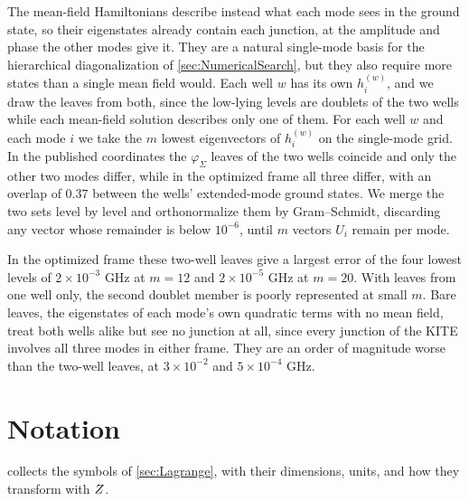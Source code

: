 The mean-field Hamiltonians describe instead what each mode sees in the ground state, so their eigenstates already contain each junction, at the amplitude and phase the other modes give it.
They are a natural single-mode basis for the hierarchical diagonalization of \cref{sec:NumericalSearch}, but they also require more states than a single mean field would.
Each well $w$ has its own $h_i^{(w)}$, and we draw the leaves from both, since the low-lying levels are doublets of the two wells while each mean-field solution describes only one of them.
For each well $w$ and each mode $i$ we take the $m$ lowest eigenvectors of $h_i^{(w)}$ on the single-mode grid.
In the published coordinates the $\varphi_\Sigma$ leaves of the two wells coincide and only the other two modes differ, while in the optimized frame all three differ, with an overlap of $0.37$ between the wells' extended-mode ground states.
We merge the two sets level by level and orthonormalize them by Gram--Schmidt, discarding any vector whose remainder is below $10^{-6}$, until $m$ vectors $U_i$ remain per mode.

In the optimized frame these two-well leaves give a largest error of the four lowest levels of $2\times10^{-3}$ GHz at $m=12$ and $2\times10^{-5}$ GHz at $m=20$.
With leaves from one well only, the second doublet member is poorly represented at small $m$.
Bare leaves, the eigenstates of each mode's own quadratic terms with no mean field, treat both wells alike but see no junction at all, since every junction of the KITE involves all three modes in either frame.
They are an order of magnitude worse than the two-well leaves, at $3\times10^{-2}$ and $5\times10^{-4}$ GHz.

\newpage
\section{Notation}\label{apx:notation}
 collects the symbols of \cref{sec:Lagrange}, with their dimensions, units, and how they transform with $Z$.

